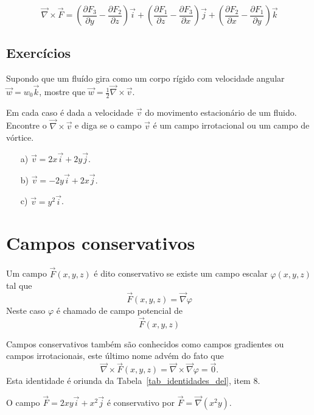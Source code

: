 $$\vec{\nabla}\times \vec{F} = \left(\frac{\partial F_3}{\partial y} - \frac{\partial F_2}{\partial z}\right) \vec{i} + \left(\frac{\partial F_1}{\partial z} - \frac{\partial F_3}{\partial x} \right) \vec{j} + \left(\frac{\partial F_2}{\partial x} - \frac{\partial F_1}{\partial y} \right) \vec{k}$$


\subsection*{Exercícios}
\begin{exer}
Supondo que um fluído gira como um corpo rígido com velocidade angular $\vec{w}=w_0\vec{k}$, mostre que $\vec{w}=\frac{1}{2}\vec{\nabla}\times \vec{v}$.
\end{exer}

\begin{exer}
Em cada caso é dada a velocidade $\vec{v}$ do movimento estacionário de um fluido. Encontre o $\vec{\nabla}\times\vec{v}$ e diga se o campo $\vec{v}$ é um campo irrotacional ou um campo de vórtice.
\begin{itemize}
 \item[a)] $\vec{v}=2x\vec{i}+2y\vec{j}$.
 \item[b)] $\vec{v}=-2y\vec{i}+2x\vec{j}$.
 \item[c)] $\vec{v}=y^2\vec{i}$.
 \end{itemize}

\end{exer}




\section{Campos conservativos}
\begin{defn} \label{def_campo_conservativo}  Um campo $\vec{F}(x,y,z)$ é dito conservativo se existe um campo escalar $\varphi(x,y,z)$ tal que
$$\vec{F}(x,y,z) = \vec{\nabla}\varphi$$
Neste caso $\varphi$ é chamado de campo potencial de $$\vec{F}(x,y,z)$$
\end{defn}
\begin{obs} Campos conservativos também são conhecidos como campos gradientes ou campos irrotacionais, este último nome advém do fato que $$\vec{\nabla}\times\vec{F}(x,y,z) = \vec{\nabla}\times\vec{\nabla}\varphi=\vec{0}.$$
Esta identidade é oriunda da Tabela~\ref{tab_identidades_del}, item 8.
 \end{obs}
\begin{ex} O campo $\vec{F}=2xy\vec{i}+x^2\vec{j}$ é conservativo por $\vec{F}=\vec{\nabla}\left(x^2y\right)$.
 \end{ex}

